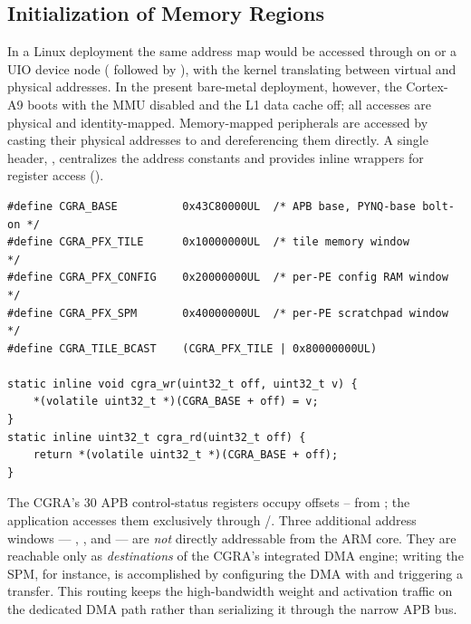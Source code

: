 \subsection{Initialization of Memory Regions}
\label{ssec:mmap}

In a Linux deployment the same address map would be accessed through
 on  or a UIO device node
( followed by
),
with the kernel translating between virtual and physical addresses.
In the present bare-metal deployment, however, the Cortex-A9 boots
with the MMU disabled and the L1 data cache off; all accesses are
physical and identity-mapped. Memory-mapped peripherals are accessed
by casting their physical addresses to  and
dereferencing them directly. A single header, , centralizes
the address constants and provides inline wrappers for register access
().

\begin{lstlisting}[caption={Base addresses and register helpers for the
CGRA APB and DMA windows (excerpt from \file{cgra.h}).},
label={lst:cgra-h-base}]
#define CGRA_BASE          0x43C80000UL  /* APB base, PYNQ-base bolt-on */
#define CGRA_PFX_TILE      0x10000000UL  /* tile memory window         */
#define CGRA_PFX_CONFIG    0x20000000UL  /* per-PE config RAM window   */
#define CGRA_PFX_SPM       0x40000000UL  /* per-PE scratchpad window   */
#define CGRA_TILE_BCAST    (CGRA_PFX_TILE | 0x80000000UL)

static inline void cgra_wr(uint32_t off, uint32_t v) {
    *(volatile uint32_t *)(CGRA_BASE + off) = v;
}
static inline uint32_t cgra_rd(uint32_t off) {
    return *(volatile uint32_t *)(CGRA_BASE + off);
}
\end{lstlisting}

The CGRA's 30 APB control-status registers occupy offsets
-- from ; the application accesses
them exclusively through /. Three
additional address windows --- ,
, and  --- are \emph{not}
directly addressable from the ARM core. They are reachable only as
\emph{destinations} of the CGRA's integrated DMA engine; writing the
SPM, for instance, is accomplished by configuring the DMA with
 and triggering a transfer.
This routing keeps the high-bandwidth weight and activation traffic
on the dedicated DMA path rather than serializing it through the
narrow APB bus.

